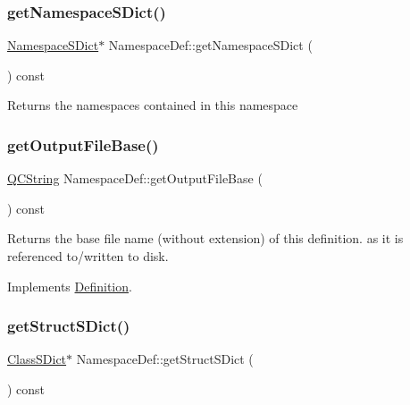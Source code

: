 \subsubsection{\texorpdfstring{getNamespaceSDict()}{getNamespaceSDict()}}
{\footnotesize\ttfamily \mbox{\hyperlink{class_namespace_s_dict}{Namespace\+S\+Dict}}$\ast$ Namespace\+Def\+::get\+Namespace\+S\+Dict (\begin{DoxyParamCaption}{ }\end{DoxyParamCaption}) const\hspace{0.3cm}{\ttfamily [inline]}}

Returns the namespaces contained in this namespace \mbox{\label{class_namespace_def_a7baf9b0abdda0393ab156d5a9eedf08f}} 
\subsubsection{\texorpdfstring{getOutputFileBase()}{getOutputFileBase()}}
{\footnotesize\ttfamily \mbox{\hyperlink{class_q_c_string}{Q\+C\+String}} Namespace\+Def\+::get\+Output\+File\+Base (\begin{DoxyParamCaption}{ }\end{DoxyParamCaption}) const\hspace{0.3cm}{\ttfamily [virtual]}}

Returns the base file name (without extension) of this definition. as it is referenced to/written to disk. 

Implements \mbox{\hyperlink{class_definition_acabecdc6bfda2015811eed5f3436322d}{Definition}}.

\mbox{\label{class_namespace_def_a2e15bce8dc41ae7ec26240b6f07db41f}} 
\subsubsection{\texorpdfstring{getStructSDict()}{getStructSDict()}}
{\footnotesize\ttfamily \mbox{\hyperlink{class_class_s_dict}{Class\+S\+Dict}}$\ast$ Namespace\+Def\+::get\+Struct\+S\+Dict (\begin{DoxyParamCaption}{ }\end{DoxyParamCaption}) const\hspace{0.3cm}{\ttfamily [inline]}}

